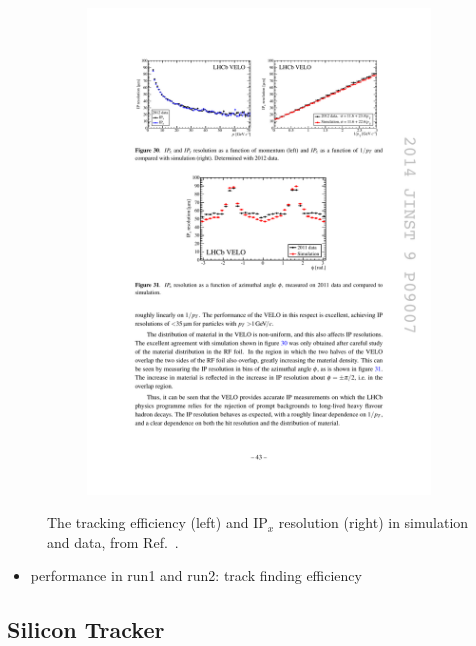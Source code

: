 \begin{figure}[!h]
\begin{subfigure}[t]{0.4\textwidth}
        \includegraphics[width=1.0\textwidth]{figs/Detector/velo_ipx_resolution.pdf}
    \end{subfigure}
    \caption{The tracking efficiency (left) and $\text{IP}_{x}$ resolution (right) in simulation and data, from Ref.~\cite{LHCb-DP-2014-001}.}
    \label{fig:Dec_velo_track_performance}   
\end{figure}


{\color{Red}
\begin{itemize}
\item performance in run1 and run2: track finding efficiency 
\end{itemize}
}




\subsection{Silicon Tracker}

